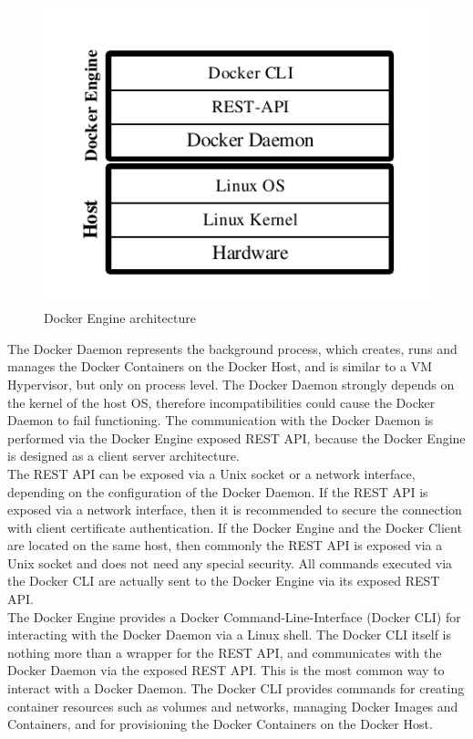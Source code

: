 \begin{figure}[htbp]
	\centering
	\includegraphics[scale=1]{images/docker-engine.pdf}
	\caption{Docker Engine architecture}
	\label{fig:docker-engine}
\end{figure} 

\label{sec:docker-daemon}
The Docker Daemon represents the background process, which creates, runs and manages the Docker Containers on the Docker Host, and is similar to a VM Hypervisor, but only on process level. The Docker Daemon strongly depends on the kernel of the host OS, therefore incompatibilities could cause the Docker Daemon to fail functioning. The communication with the Docker Daemon is performed via the Docker Engine exposed REST API,  because the Docker Engine is designed as a client server architecture. \\

\label{sec:docker-rest-api}
The REST API can be exposed via a Unix socket or a network interface, depending on the configuration of the Docker Daemon. If the REST API is exposed via a network interface, then it is recommended to secure the connection with client certificate authentication. If the Docker Engine and the Docker Client are located on the same host, then commonly the REST API is exposed via a Unix socket and does not need any special security. All commands executed via the Docker CLI are actually sent to the Docker Engine via its exposed REST API. \\

\label{sec:docker-cli}
The Docker Engine provides a Docker Command-Line-Interface (Docker CLI) for interacting with the Docker Daemon via a Linux shell. The Docker CLI itself is nothing more than a wrapper for the REST API, and communicates with the Docker Daemon via the exposed REST API. This is the most common way to interact with a Docker Daemon. The Docker CLI provides commands for creating container resources such as volumes and networks, managing Docker Images and Containers, and for provisioning the Docker Containers on the Docker Host. \\

